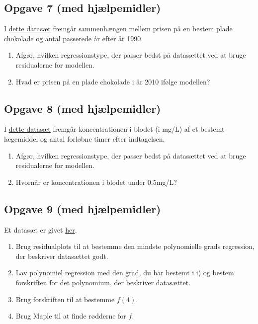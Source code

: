 \documentclass[12pt]{article}
\begin{document}
\subsection*{Opgave 7 (med hjælpemidler)}

I \href{https://github.com/ChristianJLex/TeachingNotes/raw/master/2023-2024/Data og lign/Chokoladepris.xlsx}{\color{blue!60} dette datasæt} fremgår sammenhængen mellem prisen på en bestem plade chokolade og antal passerede år efter år 1990.

\begin{enumerate}[label=\roman*)]
	\item Afgør, hvilken regressionstype, der passer bedst på datasættet ved at bruge 
	residualerne for modellen.
	\item Hvad er prisen på en plade chokolade i år 2010 ifølge modellen?
\end{enumerate}

\subsection*{Opgave 8 (med hjælpemidler)}

I \href{https://github.com/ChristianJLex/TeachingNotes/raw/master/2023-2024/Data og lign/Laegemiddel.xlsx}{\color{blue!60} dette datasæt} fremgår koncentrationen i blodet (i mg/L) af et bestemt lægemiddel og antal forløbne timer efter indtagelsen.

\begin{enumerate}[label=\roman*)]
	\item Afgør, hvilken regressionstype, der passer bedst på datasættet ved at bruge 
	residualerne for modellen.
	\item Hvornår er koncentrationen i blodet under 0.5mg/L?
\end{enumerate}

\subsection*{Opgave 9 (med hjælpemidler)}
	Et datasæt er givet \href{https://github.com/ChristianJLex/TeachingNotes/raw/master/2023-2024/Data og lign/poly_opgave1.xlsx}{\color{blue!60} her}.
	\begin{enumerate}[label=\roman*)]
		\item Brug residualplots til at bestemme den mindste polynomielle grads regression, 
		der beskriver datasættet godt. 
		\item Lav polynomiel regression med den grad, du har bestemt i i) og bestem 
		forskriften for det polynomium, der beskriver datasættet.
		\item Brug forskriften til at bestemme $f(4)$.
		\item Brug Maple til at finde rødderne for $f$.
	\end{enumerate}
\end{document}
